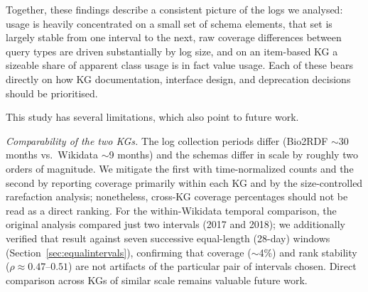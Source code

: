 \documentclass[sw]{iosart2x}
\begin{document}

Together, these findings describe a consistent picture of the logs we analysed: usage is heavily concentrated on a small set of schema elements, that set is largely stable from one interval to the next, raw coverage differences between query types are driven substantially by log size, and on an item-based KG a sizeable share of apparent class usage is in fact value usage. Each of these bears directly on how KG documentation, interface design, and deprecation decisions should be prioritised.

This study has several limitations, which also point to future work.

\emph{Comparability of the two KGs.} The log collection periods differ (Bio2RDF $\sim$30 months vs.\ Wikidata $\sim$9 months) and the schemas differ in scale by roughly two orders of magnitude. We mitigate the first with time-normalized counts and the second by reporting coverage primarily within each KG and by the size-controlled rarefaction analysis; nonetheless, cross-KG coverage percentages should not be read as a direct ranking. For the within-Wikidata temporal comparison, the original analysis compared just two intervals (2017 and 2018); we additionally verified that result against seven successive equal-length (28-day) windows (Section~\ref{sec:equalintervals}), confirming that coverage ($\sim$4\%) and rank stability ($\rho \approx 0.47$--$0.51$) are not artifacts of the particular pair of intervals chosen. Direct comparison across KGs of similar scale remains valuable future work.
\end{document}
